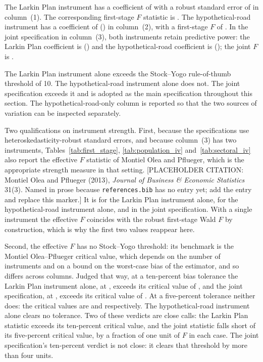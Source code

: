 The Larkin Plan instrument has a coefficient of \fsLPCoef{} with a robust
standard error of \fsLPSE{} in column~(1). The corresponding first-stage
$F$ statistic is \firstStageFLP{}. The hypothetical-road instrument has a
coefficient of \fsHypoCoef{} (\fsHypoSE{}) in column~(2), with a first-stage $F$ of
\firstStageFHypo{}. In the joint specification in column~(3), both instruments
retain predictive power: the Larkin Plan coefficient is \fsJointLPCoef{} (\fsJointLPSE{})
and the hypothetical-road coefficient is \fsJointHypoCoef{} (\fsJointHypoSE{}); the joint $F$
is \firstStageFBoth{}.

The Larkin Plan instrument alone exceeds the Stock--Yogo rule-of-thumb
threshold of 10. The hypothetical-road instrument alone does not. The
joint specification exceeds it and is adopted as the main specification
throughout this section. The hypothetical-road-only column is reported so
that the two sources of variation can be inspected separately.

Two qualifications on instrument strength. First, because the
specifications use heteroskedasticity-robust standard errors, and because
column~(3) has two instruments, Tables~\ref{tab:first_stage},
\ref{tab:population_iv} and~\ref{tab:sectoral_iv} also report the
effective $F$ statistic of Montiel Olea and Pflueger, which is the
appropriate strength measure in that setting.
{\color{red}[PLACEHOLDER CITATION: Montiel Olea and Pflueger (2013),
\emph{Journal of Business \& Economic Statistics} 31(3). Named in prose
because \texttt{references.bib} has no entry yet; add the entry and
replace this marker.]}
It is \effFLP{} for the Larkin Plan instrument alone, \effFHypo{} for the
hypothetical-road instrument alone, and \effFBoth{} in the joint
specification. With a single instrument the effective $F$ coincides with
the robust first-stage Wald $F$ by construction, which is why the first
two values reappear here.

Second, the effective $F$ has no Stock--Yogo threshold: its benchmark is
the Montiel Olea--Pflueger critical value, which depends on the number of
instruments and on a bound on the worst-case bias of the estimator, and so
differs across columns. Judged that way, at a ten-percent bias tolerance
the Larkin Plan instrument alone, at \effFLP{}, exceeds its critical
value of \mopCVtenLP{}, and the joint specification, at \effFBoth{},
exceeds its critical value of \mopCVtenBoth{}. At a five-percent
tolerance neither does: the critical values are \mopCVfiveLP{} and
\mopCVfiveBoth{} respectively. The hypothetical-road instrument alone
clears no tolerance. Two of these verdicts are close calls: the Larkin
Plan statistic exceeds its ten-percent critical value, and the joint
statistic falls short of its five-percent critical value, by a fraction
of one unit of $F$ in each case. The joint specification's ten-percent
verdict is not close: it clears that threshold by more than four units.


